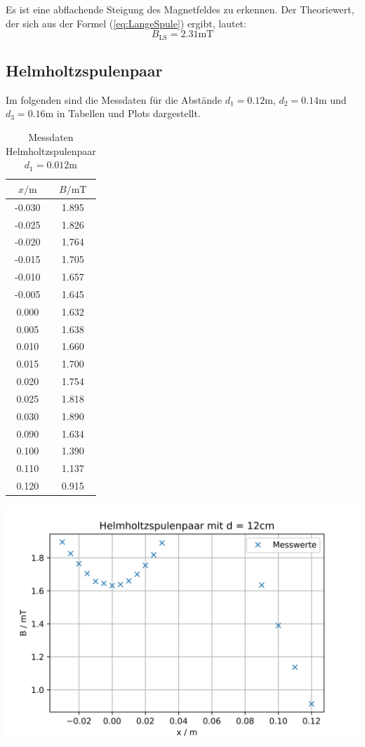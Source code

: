 Es ist eine abflachende Steigung des Magnetfeldes zu erkennen. Der Theoriewert, der sich aus der Formel (\ref{eq:LangeSpule}) ergibt, lautet:
\begin{equation}
  B_{\text{LS}} = 2.31 \unit{\milli\tesla}
\end{equation}


\subsection{Helmholtzspulenpaar}

Im folgenden sind die Messdaten für die Abstände $d_{1} = 0.12\unit\m$, $d_{2} = 0.14\unit\m$ und $d_{3} = 0.16\unit\m$ in Tabellen und Plots dargestellt.

\begin{table}
\centering
\caption{Messdaten Helmholtzspulenpaar $d_{1} = 0.012\unit\m$}
\begin{tabular}{c c}
  \toprule
  $x / \unit\m$ &  $B / \unit{\milli\tesla}$ \\
  \midrule
  -0.030 &        1.895 \\
  -0.025 &        1.826 \\
  -0.020 &        1.764 \\
  -0.015 &        1.705 \\
  -0.010 &        1.657 \\
  -0.005 &        1.645 \\
   0.000 &        1.632 \\
   0.005 &        1.638 \\
   0.010 &        1.660 \\
   0.015 &        1.700 \\
   0.020 &        1.754 \\
   0.025 &        1.818 \\
   0.030 &        1.890 \\
   0.090 &        1.634 \\
   0.100 &        1.390 \\
   0.110 &        1.137 \\
   0.120 &        0.915 \\
  \bottomrule
\end{tabular}
\end{table}

\includegraphics[width=\textwidth]{pictures/Helmholtz1.png}    %

